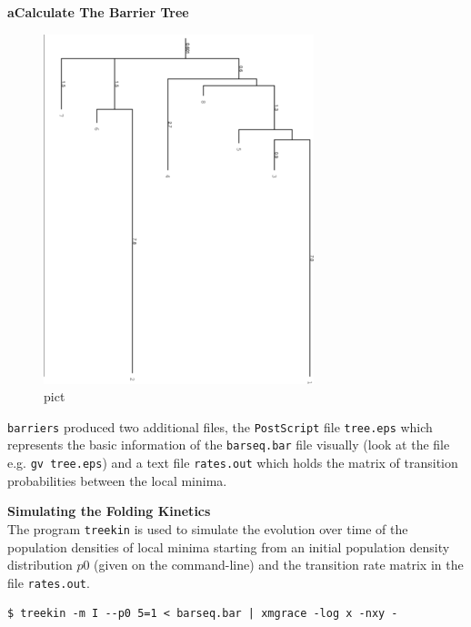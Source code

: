 \documentclass[]{article}
\begin{document}
\textbf{aCalculate The Barrier Tree}\\

\begin{figure}[htbp]
\centering
\includegraphics{Figs/tree.png}
\caption{pict}
\end{figure}

\texttt{barriers} produced two additional files, the \texttt{PostScript}
file \texttt{tree.eps} which represents the basic information of the
\texttt{barseq.bar} file visually (look at the file e.g.
\texttt{gv\ tree.eps}) and a text file \texttt{rates.out} which holds the
matrix of transition probabilities between the local minima.

\textbf{Simulating the Folding Kinetics}\\
 The program \texttt{treekin} is used to simulate the evolution over
time of the population densities of local minima starting from an
initial population density distribution \(p0\) (given on the
command-line) and the transition rate matrix in the file
\texttt{rates.out}.

\begin{verbatim}
$ treekin -m I --p0 5=1 < barseq.bar | xmgrace -log x -nxy -
\end{verbatim}
\end{document}
